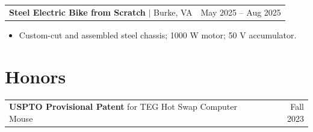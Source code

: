 \documentclass[letterpaper,10pt]{article}
\makeatletter
\newcommand{\entry}[3]{%
  \begin{tabularx}{\textwidth}{@{}X r@{}}
    \textbf{#1}#2 & #3
  \end{tabularx}\par
}
\newenvironment{bullets}
  {\begin{itemize}[leftmargin=11pt,labelsep=4pt,topsep=2pt,partopsep=0pt,
                   parsep=0pt,itemsep=1pt,label=\textbullet,
                   after=\vspace{4pt}]}
  {\end{itemize}}
\makeatother
\begin{document}
\entry{Steel Electric Bike from Scratch}{ $|$ Burke, VA}{May 2025 -- Aug 2025}
\begin{bullets}
  \item Custom-cut and assembled steel chassis; 1000 W motor; 50 V accumulator.
\end{bullets}

\section{Honors}
\entry{USPTO Provisional Patent}{ for TEG Hot Swap Computer Mouse}{Fall 2023}
\end{document}
